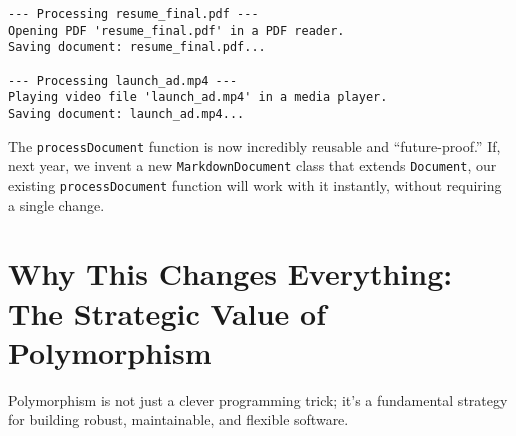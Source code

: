\documentclass[
  letterpaper,
  DIV=11,
  numbers=noendperiod]{scrreprt}
\begin{document}
\begin{verbatim}
--- Processing resume_final.pdf ---
Opening PDF 'resume_final.pdf' in a PDF reader.
Saving document: resume_final.pdf...

--- Processing launch_ad.mp4 ---
Playing video file 'launch_ad.mp4' in a media player.
Saving document: launch_ad.mp4...
\end{verbatim}

The \texttt{processDocument} function is now incredibly reusable and
``future-proof.'' If, next year, we invent a new
\texttt{MarkdownDocument} class that extends \texttt{Document}, our
existing \texttt{processDocument} function will work with it instantly,
without requiring a single change.

\section{Why This Changes Everything: The Strategic Value of
Polymorphism}\label{why-this-changes-everything-the-strategic-value-of-polymorphism}

Polymorphism is not just a clever programming trick; it's a fundamental
strategy for building robust, maintainable, and flexible software.
\end{document}
